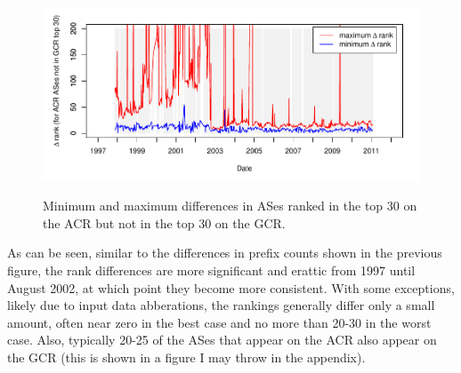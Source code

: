 \begin{figure}[h!]
\begin{centering}
\begin{singlespace}
    \includegraphics[width=6in]{figures/cidr_report_validity_rank_error.pdf}
    \vspace{-2em}\\
    \caption{Minimum and maximum differences in ASes ranked in the top 30 on
        the ACR but not in the top 30 on the GCR.}
    \label{fig:comp_rank_error}
\end{singlespace}
\end{centering}
\end{figure}

As can be seen, similar to the differences in prefix counts shown in the
previous figure, the rank differences are more significant and erattic from
1997 until August 2002, at which point they become more consistent. With some
exceptions, likely due to input data abberations, the rankings generally differ
only a small amount, often near zero in the best case and no more than 20-30
in the worst case. Also, typically 20-25 of the ASes that appear on the ACR
also appear on the GCR (this is shown in a figure I may throw in the appendix).

%

